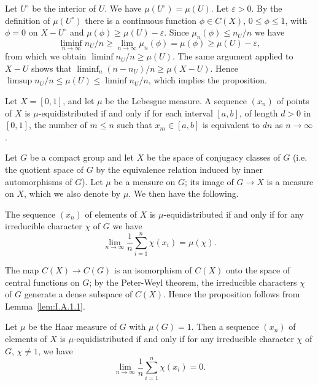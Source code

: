 \begin{remarks}
\begin{nlist}
\item Let $U^\circ$ be the interior of $U$. We have $\mu(U^\circ) = \mu(U)$. Let $\varepsilon > 0$. By the definition of $\mu(U^\circ)$ there is a continuous function $\phi \in C(X)$, $0 \leq \phi \leq 1$, with $\phi = 0$ on $X - U^\circ$ and $\mu(\phi) \geq \mu(U) - \varepsilon$. Since $\mu_n(\phi) \leq n_U/n$ we have
\[
\liminf_{n \to \infty} n_U/n \geq \lim_{n \to \infty} \mu_n(\phi) = \mu(\phi) \geq \mu(U) - \varepsilon,
\]
from which we obtain $\liminf n_U/n \geq \mu(U)$. The same argument applied to $X - U$ shows that $\liminf_{n} (n - n_U)/n \geq \mu(X - U)$. Hence $\limsup n_U/n \leq \mu(U) \leq \liminf n_U/n$, which implies the proposition.

\item Let $X = [0,1]$, and let $\mu$ be the Lebesgue measure. A sequence $(x_n)$ of points of $X$ is $\mu$-equidistributed if and only if for each interval $[a,b]$, of length $d > 0$ in $[0,1]$, the number of $m \leq n$ such that $x_m \in [a,b]$ is equivalent to $dn$ as $n \to \infty$.

\item Let $G$ be a compact group and let $X$ be the space of conjugacy classes of $G$ (i.e. the quotient space of $G$ by the equivalence relation induced by inner automorphisms of $G$). Let $\mu$ be a measure on $G$; its image of $G \to X$ is a measure on $X$, which we also denote by $\mu$. We then have the following.
\end{nlist}
\end{remarks}

\begin{proposition}[2]\label{prop:I.A.1.2}
The sequence $(x_n)$ of elements of $X$ is $\mu$-equidistributed if and only if for any irreducible character $\chi$ of $G$ we have
\[
\lim_{n \to \infty} \frac{1}{n} \sum_{i=1}^{n} \chi(x_i) = \mu(\chi).
\]
\end{proposition}

The map $C(X) \to C(G)$ is an isomorphism of $C(X)$ onto the space of central functions on $G$; by the Peter-Weyl theorem, the irreducible characters $\chi$ of $G$ generate a dense subspace of $C(X)$. Hence the proposition follows from Lemma~\ref{lem:I.A.1.1}.

\begin{corollary}[1]\label{cor:I.A.1.1}
Let $\mu$ be the Haar measure of $G$ with $\mu(G) = 1$. Then a sequence $(x_n)$ of elements of $X$ is $\mu$-equidistributed if and only if for any irreducible character $\chi$ of $G$, $\chi \neq 1$, we have
\[
\lim_{n \to \infty} \frac{1}{n} \sum_{i=1}^{n} \chi(x_i) = 0.
\]
\end{corollary}

